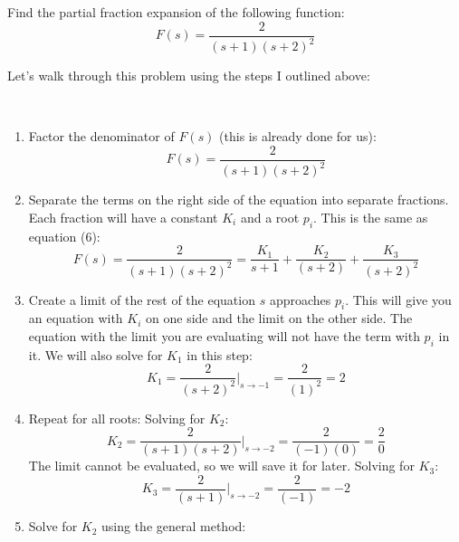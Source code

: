 \documentclass{article}
\theoremstyle{mytheoremstyle}
\theoremstyle{mytheoremstyle}
\theoremstyle{myproblemstyle}
\theoremstyle{break}
\begin{document}
\begin{problem}
Find the partial fraction expansion of the following function:
\begin{equation}
	F(s) = \frac{2}{(s+1)(s+2)^2}
\end{equation}
\end{problem}
Let's walk through this problem using the steps I outlined above:

\begin{solution}[\textcolor{blue}{Repeated Real Roots}]~
	\begin{enumerate}
		\item Factor the denominator of $F(s)$ (this is already done for us):
		      \begin{equation}
			      F(s) = \frac{2}{(s+1)(s+2)^2}
		      \end{equation}
		\item Separate the terms on the right side of the equation into separate fractions. Each fraction will have a constant $K_i$ and a root $p_i$. This is the same as equation (6):
		      \begin{equation}
			      F(s) = \frac{2}{(s+1)(s+2)^2} = \frac{K_1}{s+1} + \frac{K_2}{(s+2)} + \frac{K_3}{(s+2)^2}
		      \end{equation}
		\item Create a limit of the rest of the equation $s$ approaches $p_i$. This will give you an equation with $K_i$ on one side and the limit on the other side. The equation with the limit you are evaluating will not have the term with $p_i$ in it. We will also solve for $K_1$ in this step:
		      \begin{equation}
			      K_1 = \frac{2}{(s+2)^2} \Big|_{s \to -1} = \frac{2}{(1)^2} = 2
		      \end{equation}
		\item Repeat for all roots:
		      \subitem Solving for $K_2$:
		      \begin{equation}
			      K_2 = \frac{2}{(s+1)(s+2)} \Big|_{s \to -2} = \frac{2}{(-1)(0)} = \frac{2}{0}
		      \end{equation}
		      \subitem The limit cannot be evaluated, so we will save it for later.
		      \subitem Solving for $K_3$:
		      \begin{equation}
			      K_3 = \frac{2}{(s+1)} \Big|_{s \to -2} = \frac{2}{(-1)} = -2
		      \end{equation}
		\item Solve for $K_2$ using the general method:
		      \begin{equation}

\end{equation}
\end{enumerate}
\end{solution}
\end{document}
